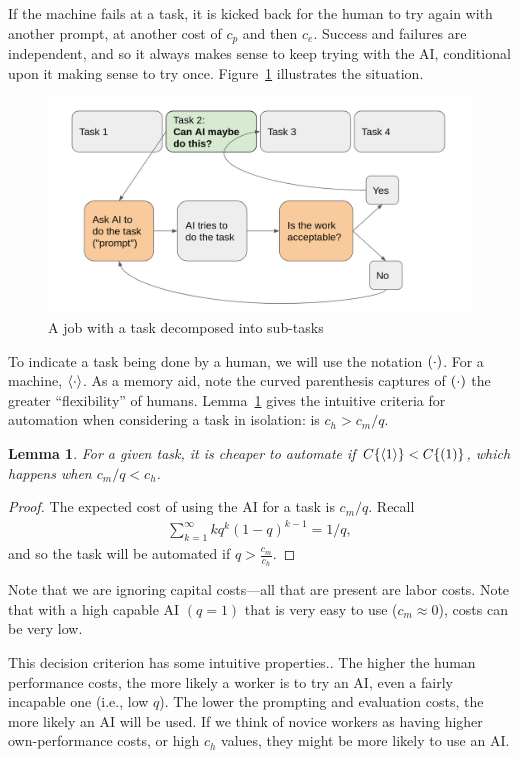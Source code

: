 \documentclass{article}
\newtheorem{lemma}[theorem]{Lemma}
\begin{document}
If the machine fails at a task, it is kicked back for the human to try again with another prompt, at another cost of $c_p$ and then $c_e$.
Success and failures are independent, and so it always makes sense to keep trying with the AI, conditional upon it making sense to try once.
Figure~\ref{fig:flow} illustrates the situation.

\begin{figure}
\caption{A job with a task decomposed into sub-tasks} \label{fig:flow}
\includegraphics[width = \textwidth]{flow.png}
\end{figure}

To indicate a task being done by a human, we will use the notation $( \cdot )$.
For a machine, $\langle \cdot \rangle$.
As a memory aid, note the curved parenthesis captures of $( \cdot{} )$ the greater ``flexibility'' of humans. 
Lemma~\ref{lemma:when} gives the intuitive criteria for automation when considering a task in isolation: is $c_h > c_m / q$.

\begin{lemma} \label{lemma:when}
 For a given task, it is cheaper to automate if $C\{ \langle 1 \rangle \} < C\{ ( 1 ) \}$, which happens when $c_m / q < c_h$.
\end{lemma}
\begin{proof}
  The expected cost of using the AI for a task is $c_m/q$.
  Recall
  \begin{align}
    \sum_{k=1}^\infty k q^k (1-q)^{k-1} = 1/q,
  \end{align}
and so the task will be automated if $q > \frac{c_m}{c_h}.$
\end{proof}
Note that we are ignoring capital costs---all that are present are labor costs.
Note that with a high capable AI $(q = 1)$ that is very easy to use ($c_m \approx 0$), costs can be very low.

This decision criterion has some intuitive properties..
The higher the human performance costs, the more likely a worker is to try an AI, even a fairly incapable one (i.e., low $q$).
The lower the prompting and evaluation costs, the more likely an AI will be used.
If we think of novice workers as having higher own-performance costs, or high $c_h$ values, they might be more likely to use an AI.
\end{document}
